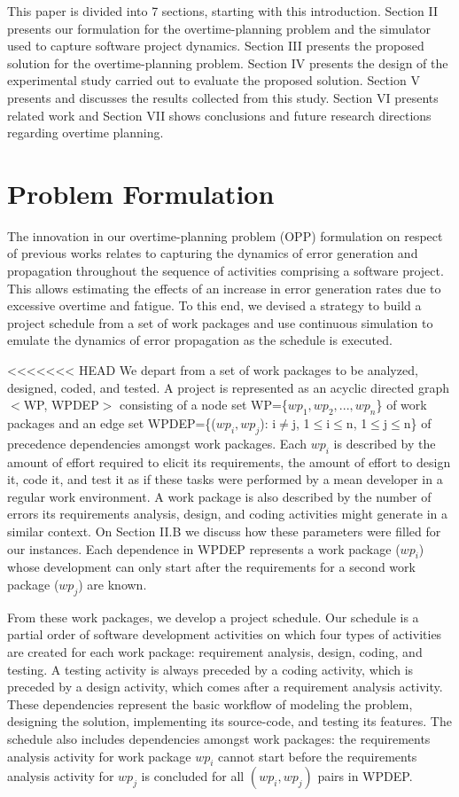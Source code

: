 \documentclass[conference]{IEEEtran}
\begin{document}
This paper is divided into 7 sections, starting with this introduction. Section II presents our formulation for the overtime-planning problem and the simulator used to capture software project dynamics. Section III presents the proposed solution for the overtime-planning problem. Section IV presents the design of the experimental study carried out to evaluate the proposed solution. Section V presents and discusses the results collected from this study. Section VI presents related work and Section VII shows conclusions and future research directions regarding overtime planning.

\section{Problem Formulation}
The innovation in our overtime-planning problem (OPP) formulation on respect of previous works relates to capturing the dynamics of error generation and propagation throughout the sequence of activities comprising a software project. This allows estimating the effects of an increase in error generation rates due to excessive overtime and fatigue. To this end, we devised a strategy to build a project schedule from a set of work packages and use continuous simulation to emulate the dynamics of error propagation as the schedule is executed.

<<<<<<< HEAD
We depart from a set of work packages to be analyzed, designed, coded, and tested. A project is represented as an acyclic directed graph $<$WP, WPDEP$>$ consisting of a node set WP=\{$wp_1, wp_2, ..., wp_n$\} of work packages and an edge set WPDEP=\{($wp_i, wp_j$): i$\not=$j, 1$\leq$i$\leq$n, 1$\leq$j$\leq$n\} of precedence dependencies amongst work packages. Each $wp_i$ is described by the amount of effort required to elicit its requirements, the amount of effort to design it, code it, and test it as if these tasks were performed by a mean developer in a regular work environment. A work package is also described by the number of errors its requirements analysis, design, and coding activities might generate in a similar context. On Section II.B we discuss how these parameters were filled for our instances. Each dependence in WPDEP represents a work package ($wp_i$) whose development can only start after the requirements for a second work package ($wp_j$) are known.

From these work packages, we develop a project schedule. Our schedule is a partial order of software development activities on which four types of activities are created for each work package: requirement analysis, design, coding, and testing. A testing activity is always preceded by a coding activity, which is preceded by a design activity, which comes after a requirement analysis activity. These dependencies represent the basic workflow of modeling the problem, designing the solution, implementing its source-code, and testing its features. The schedule also includes dependencies amongst work packages: the requirements analysis activity for work package $wp_i$ cannot start before the requirements analysis activity for $wp_j$ is concluded for all $(wp_i, wp_j)$ pairs in WPDEP. 
\end{document}
